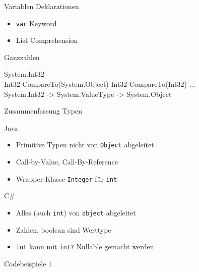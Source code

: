 \documentclass[11pt]{beamer}
\begin{document}
\begin{frame}{Variablen Deklarationen}

\begin{itemize}
	\item \texttt{var} Keyword
	\item List Comprehension
\end{itemize}
\end{frame}


\begin{frame}{Ganzzahlen}


System.Int32 \\
Int32 CompareTo(System.Object) Int32 CompareTo(Int32) ... \\
System.Int32 -> System.ValueType -> System.Object
\end{frame}

\begin{frame}{Zusammenfassung Typen}
\begin{multicols}{2}
	Java \\
	\begin{itemize}
		\item Primitive Typen nicht von \texttt{Object} abgeleitet
		\item Call-by-Value, Call-By-Reference
		\item Wrapper-Klasse \texttt{Integer} für \texttt{int}
	\end{itemize}

\columnbreak

	C\#\\
	\begin{itemize}
		\item Alles (auch \texttt{int}) von \texttt{object} abgeleitet
		\item Zahlen, boolean sind \glqq{}Werttype\grqq{}
		\item \texttt{int} kann mit \texttt{int?} Nullable gemacht werden
	\end{itemize}
\end{multicols}
\end{frame}

\begin{frame}{Codebeispiele 1}


\end{frame}
\end{document}
